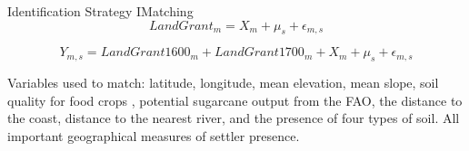 \documentclass[aspectratio=1610]{beamer}
\begin{document}

\begin{frame}{Identification Strategy I}{Matching}
    \begin{equation}
        LandGrant_m = X_{m} + \mu_s + \epsilon_{m,s}
    \end{equation}

    \begin{equation}
        Y_{m,s} = LandGrant1600_m + LandGrant1700_m + X_{m} + \mu_s + \epsilon_{m,s}
    \end{equation}

    \vspace{2mm}

    \begin{outline}
        \1 Variables used to match: latitude, longitude, mean elevation, mean slope, soil quality for food crops \parencite{Galor2016-ba}, potential sugarcane output from the FAO, the distance to the coast, distance to the nearest river, and the presence of four types of soil.
        \vspace{2mm}
            \2 All important geographical measures of settler presence.
    \end{outline}   
\end{frame}
\end{document}
